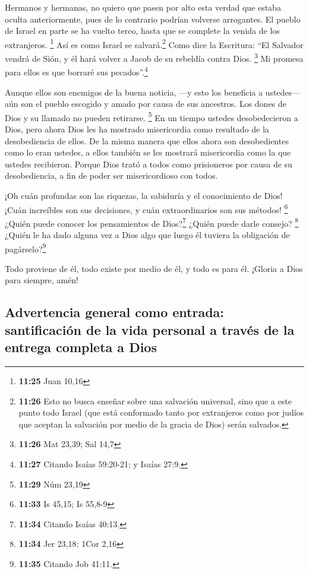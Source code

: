  Hermanos y hermanas, no quiero que pasen por alto esta
verdad que estaba oculta anteriormente, pues de lo contrario podrían
volverse arrogantes. El pueblo de Israel en parte se ha vuelto terco,
hasta que se complete la venida de los extranjeros. \footnote{\textbf{11:25}
  Juan 10,16}  Así es como Israel se salvará.\footnote{\textbf{11:26}
  Esto no busca enseñar sobre una salvación universal, sino que a este
  punto todo Israel (que está conformado tanto por extranjeros como por
  judíos que aceptan la salvación por medio de la gracia de Dios) serán
  salvados.} Como dice la Escritura: ``El Salvador vendrá de Sión, y él
hará volver a Jacob de su rebeldía contra Dios. \footnote{\textbf{11:26}
  Mat 23,39; Sal 14,7}  Mi promesa para ellos es que
borraré sus pecados''.\footnote{\textbf{11:27} Citando Isaías 59:20-21;
  y Isaías 27:9.}

 Aunque ellos son enemigos de la buena noticia, ---y esto
los beneficia a ustedes---aún son el pueblo escogido y amado por causa
de sus ancestros.  Los dones de Dios y su llamado no
pueden retirarse. \footnote{\textbf{11:29} Núm 23,19}  En
un tiempo ustedes desobedecieron a Dios, pero ahora Dios les ha mostrado
misericordia como resultado de la desobediencia de ellos.
 De la misma manera que ellos ahora son desobedientes
como lo eran ustedes, a ellos también se les mostrará misericordia como
la que ustedes recibieron.  Porque Dios trató a todos
como prisioneros por causa de su desobediencia, a fin de poder ser
misericordioso con todos.

 ¡Oh cuán profundas son las riquezas, la sabiduría y el
conocimiento de Dios! ¡Cuán increíbles son sus decisiones, y cuán
extraordinarios son sus métodos! \footnote{\textbf{11:33} Is 45,15; Is
  55,8-9}  ¿Quién puede conocer los pensamientos de
Dios?\footnote{\textbf{11:34} Citando Isaías 40:13.} ¿Quién puede darle
consejo? \footnote{\textbf{11:34} Jer 23,18; 1Cor 2,16} 
¿Quién le ha dado alguna vez a Dios algo que luego él tuviera la
obligación de pagárselo?\footnote{\textbf{11:35} Citando Job 41:11.}

 Todo proviene de él, todo existe por medio de él, y todo
es para él. ¡Gloria a Dios para siempre, amén!

\hypertarget{advertencia-general-como-entrada-santificaciuxf3n-de-la-vida-personal-a-travuxe9s-de-la-entrega-completa-a-dios}{%
\subsection{Advertencia general como entrada: santificación de la vida
personal a través de la entrega completa a
Dios}\label{advertencia-general-como-entrada-santificaciuxf3n-de-la-vida-personal-a-travuxe9s-de-la-entrega-completa-a-dios}}

